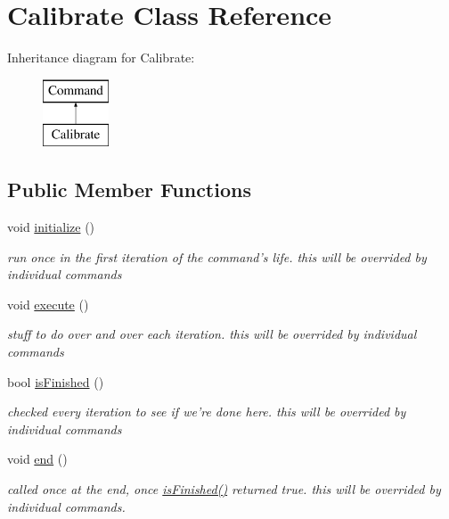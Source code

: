 \hypertarget{classCalibrate}{\section{Calibrate Class Reference}
\label{classCalibrate}
}
Inheritance diagram for Calibrate\-:\begin{figure}[H]
\begin{center}
\leavevmode
\includegraphics[height=2.000000cm]{classCalibrate}
\end{center}
\end{figure}
\subsection*{Public Member Functions}
\begin{DoxyCompactItemize}
\item 
\hypertarget{classCalibrate_a67ac70871401c5b6e74fa92fa4b57f1e}{void \hyperlink{classCalibrate_a67ac70871401c5b6e74fa92fa4b57f1e}{initialize} ()}\label{classCalibrate_a67ac70871401c5b6e74fa92fa4b57f1e}

\begin{DoxyCompactList}\small\item\em run once in the first iteration of the command's life. this will be overrided by individual commands \end{DoxyCompactList}\item 
\hypertarget{classCalibrate_ac4d34bf2f831065219b7a930b0389b6e}{void \hyperlink{classCalibrate_ac4d34bf2f831065219b7a930b0389b6e}{execute} ()}\label{classCalibrate_ac4d34bf2f831065219b7a930b0389b6e}

\begin{DoxyCompactList}\small\item\em stuff to do over and over each iteration. this will be overrided by individual commands \end{DoxyCompactList}\item 
bool \hyperlink{classCalibrate_afb77ae82fa06d139612f11dec7b6ed5f}{is\-Finished} ()
\begin{DoxyCompactList}\small\item\em checked every iteration to see if we're done here. this will be overrided by individual commands \end{DoxyCompactList}\item 
\hypertarget{classCalibrate_a2ea8ff643d8450473d6245e407415f03}{void \hyperlink{classCalibrate_a2ea8ff643d8450473d6245e407415f03}{end} ()}\label{classCalibrate_a2ea8ff643d8450473d6245e407415f03}

\begin{DoxyCompactList}\small\item\em called once at the end, once \hyperlink{classCalibrate_afb77ae82fa06d139612f11dec7b6ed5f}{is\-Finished()} returned true. this will be overrided by individual commands. \end{DoxyCompactList}\end{DoxyCompactItemize}
